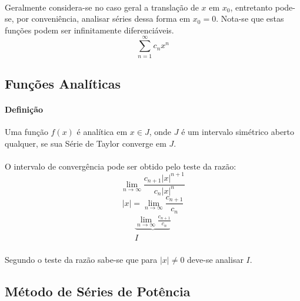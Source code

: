 \documentclass{article}
\begin{document}
            \paragraph{}Geralmente considera-se no caso geral a translação de $x$ em $x_{0}$, entretanto pode-se, por conveniência, analisar séries dessa forma em $x_{0}=0$. Nota-se que estas funções podem ser infinitamente diferenciáveis.
                \begin{equation}
                    \sum\limits_{n=1}^{\infty}c_{n}{x}^{n}
                \end{equation}
                
        \subsection{Funções Analíticas}
            \paragraph{Definição}Uma função $f(x)$ é analítica em $x\in J$, onde $J$ é um intervalo simétrico aberto qualquer, se sua Série de Taylor converge em $J$.
            \paragraph{}O intervalo de convergência pode ser obtido pelo teste da razão:
                \begin{equation}
                    \lim_{n\to\infty}\frac{c_{n+1}{|x|}^{n+1}}{c_{n}{|x|}^{n}}
                \end{equation}
                \begin{equation}
                    |x|=\lim_{n\to\infty}\frac{c_{n+1}}{c_{n}}
                \end{equation}
                \begin{equation}
                    \begin{matrix} \underbrace{\lim_{n\to\infty}\frac{c_{n+1}}{c_{n}}}\\I\end{matrix}
                \end{equation}
            \paragraph{}Segundo o teste da razão sabe-se que para $|x|\ne 0$ deve-se analisar $I$.
            \paragraph{}

        \subsection{Método de Séries de Potência}
\end{document}
